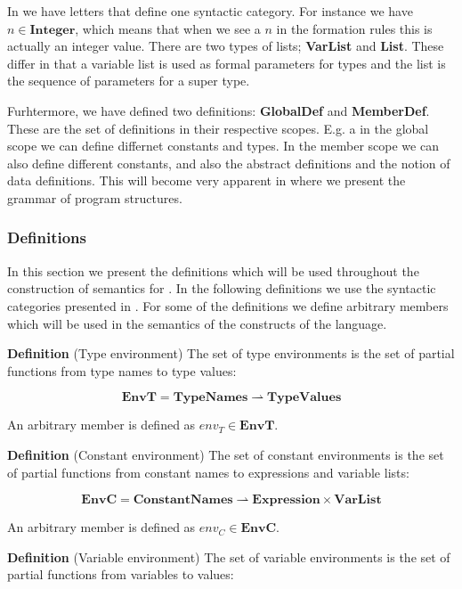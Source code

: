 In  we have letters that define one syntactic
category. For instance we have $n \in \mathbf{Integer}$, which means that when
we see a $n$ in the formation rules this is actually an integer value. There
are two types of lists; \textbf{VarList} and \textbf{List}. These differ in that
a variable list is used as formal parameters for types and the list is the
sequence of parameters for a super type. 

Furhtermore, we have defined two definitions: \textbf{GlobalDef} and
\textbf{MemberDef}. These are the set of definitions in their respective scopes.
E.g. a in the global scope we can define differnet constants and types. In the
member scope we can also define different constants, and also the abstract
definitions and the notion of data definitions. This will become very apparent
in  where we present the grammar of program structures.

\subsubsection{Definitions}
\label{sec:abstractdefinitions}

In this section we present the definitions which will be used throughout the
construction of semantics for \productname{}. In the following definitions we
use the syntactic categories presented in . For some of
the definitions we define arbitrary members which will be used in the semantics
of the constructs of the language.

\textbf{Definition} (Type environment) \hspace{0.5cm} The set of type environments is the set of
partial functions from type names to type values:

\[
  \mathbf{EnvT} = \mathbf{TypeNames} \rightharpoonup \mathbf{TypeValues}
\]

An arbitrary member is defined as $env_{T} \in \mathbf{EnvT}$.


\textbf{Definition} (Constant environment) \hspace{0.5cm} The set of constant environments is the set
of partial functions from constant names to expressions and variable lists:

\[
  \mathbf{EnvC} = \mathbf{ConstantNames} \rightharpoonup \mathbf{Expression}
  \times \mathbf{VarList}
\]

An arbitrary member is defined as $env_{C} \in \mathbf{EnvC}$.

\textbf{Definition} (Variable environment) \hspace{0.5cm} The set of variable environments is the set
of partial functions from variables to values:

